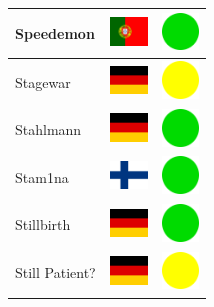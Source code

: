 \documentclass[12pt, a4paper, twoside]{report}
\begin{document}
\begin{center}
\begin{longtable}{|p{5cm}|p{2cm}|p{2cm}|}
Speedemon & \includegraphics[width=1cm]{4x3/pt} & \includegraphics[width=1cm]{likes/y} \\ \hline
Stagewar & \includegraphics[width=1cm]{4x3/de} & \includegraphics[width=1cm]{likes/m} \\ \hline
Stahlmann & \includegraphics[width=1cm]{4x3/de} & \includegraphics[width=1cm]{likes/y} \\ \hline
Stam1na & \includegraphics[width=1cm]{4x3/fi} & \includegraphics[width=1cm]{likes/y} \\ \hline
Stillbirth & \includegraphics[width=1cm]{4x3/de} & \includegraphics[width=1cm]{likes/y} \\ \hline
Still Patient? & \includegraphics[width=1cm]{4x3/de} & \includegraphics[width=1cm]{likes/m} \\ \hline

\end{longtable}
\end{center}
\end{document}
